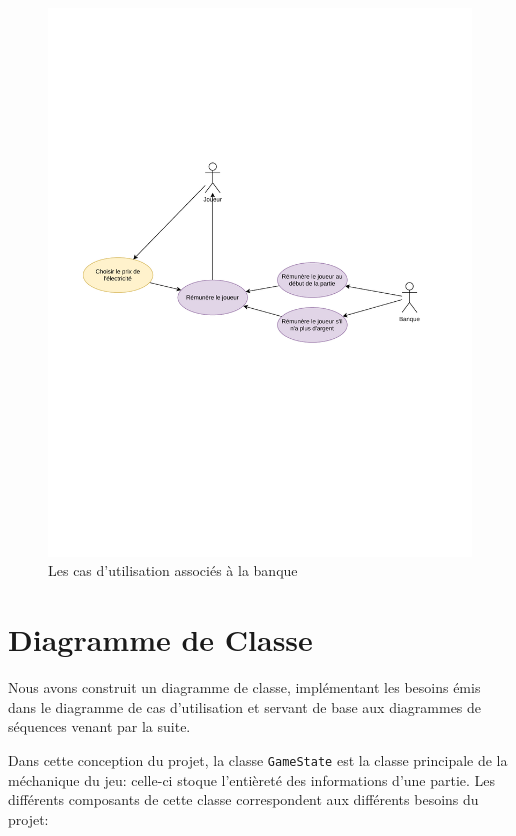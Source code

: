 \documentclass[12pt]{article}
\begin{document}
\begin{figure}[H]
    \includegraphics[width=\textwidth]{uml-usecases-Page-4}
    \caption{Les cas d'utilisation associés à la banque \label{fig:usecase-bank}}
\end{figure}


\section{Diagramme de Classe}
\label{sec:class}

Nous avons construit un diagramme de classe, implémentant les besoins émis dans le diagramme de cas d'utilisation et servant de base aux diagrammes de séquences venant par la suite.

Dans cette conception du projet, la classe \texttt{GameState} est la classe principale de la méchanique du jeu: celle-ci stoque l'entièreté des informations d'une partie.
Les différents composants de cette classe correspondent aux différents besoins du projet:
\end{document}
